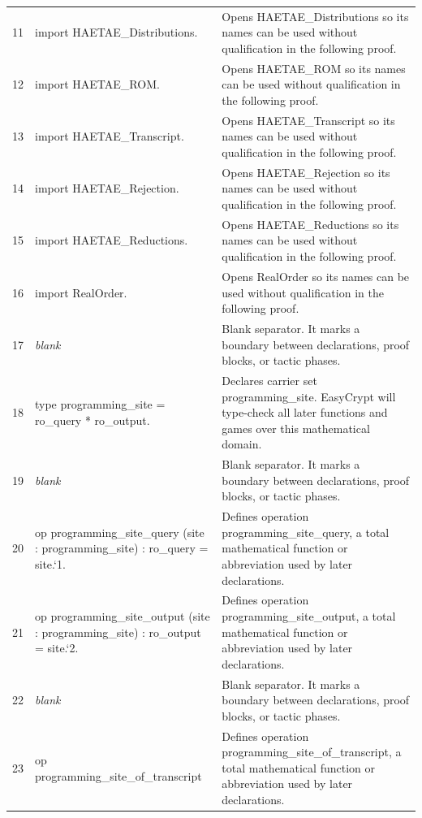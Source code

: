 \documentclass[10pt]{article}
\begin{document}
\begin{longtable}{r L{0.53\textwidth} L{0.37\textwidth}}
11 & {\ttfamily\scriptsize import HAETAE\_Distributions.} & Opens HAETAE\_Distributions so its names can be used without qualification in the following proof. \\
12 & {\ttfamily\scriptsize import HAETAE\_ROM.} & Opens HAETAE\_ROM so its names can be used without qualification in the following proof. \\
13 & {\ttfamily\scriptsize import HAETAE\_Transcript.} & Opens HAETAE\_Transcript so its names can be used without qualification in the following proof. \\
14 & {\ttfamily\scriptsize import HAETAE\_Rejection.} & Opens HAETAE\_Rejection so its names can be used without qualification in the following proof. \\
15 & {\ttfamily\scriptsize import HAETAE\_Reductions.} & Opens HAETAE\_Reductions so its names can be used without qualification in the following proof. \\
16 & {\ttfamily\scriptsize import RealOrder.} & Opens RealOrder so its names can be used without qualification in the following proof. \\
17 & {\ttfamily\scriptsize \emph{blank}} & Blank separator.  It marks a boundary between declarations, proof blocks, or tactic phases. \\
18 & {\ttfamily\scriptsize type programming\_site = ro\_query * ro\_output.} & Declares carrier set programming\_site.  EasyCrypt will type-check all later functions and games over this mathematical domain. \\
19 & {\ttfamily\scriptsize \emph{blank}} & Blank separator.  It marks a boundary between declarations, proof blocks, or tactic phases. \\
20 & {\ttfamily\scriptsize op programming\_site\_query (site : programming\_site) : ro\_query = site.`1.} & Defines operation programming\_site\_query, a total mathematical function or abbreviation used by later declarations. \\
21 & {\ttfamily\scriptsize op programming\_site\_output (site : programming\_site) : ro\_output = site.`2.} & Defines operation programming\_site\_output, a total mathematical function or abbreviation used by later declarations. \\
22 & {\ttfamily\scriptsize \emph{blank}} & Blank separator.  It marks a boundary between declarations, proof blocks, or tactic phases. \\
23 & {\ttfamily\scriptsize op programming\_site\_of\_transcript} & Defines operation programming\_site\_of\_transcript, a total mathematical function or abbreviation used by later declarations. \\

\end{longtable}
\end{document}
